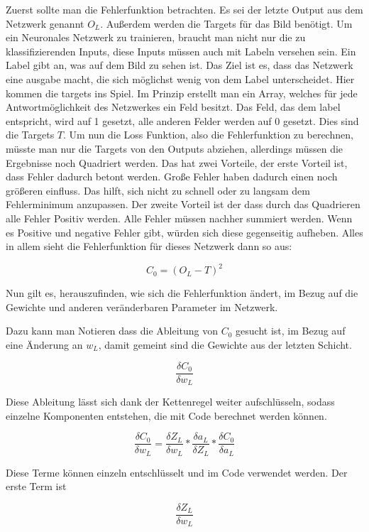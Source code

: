 \documentclass[12pt]{article}
\begin{document}
Zuerst sollte man die Fehlerfunktion betrachten. 
Es sei der letzte Output aus dem Netzwerk genannt $O_L$. Außerdem werden die Targets für das Bild benötigt. Um ein Neuronales Netzwerk zu trainieren, braucht man nicht nur die zu klassifizierenden Inputs, diese Inputs müssen auch mit Labeln versehen sein. Ein Label gibt an, was auf dem Bild zu sehen ist. Das Ziel ist es, dass das Netzwerk eine ausgabe macht, die sich möglichst wenig von dem Label unterscheidet. Hier kommen die targets ins Spiel. Im Prinzip erstellt man ein Array, welches für jede Antwortmöglichkeit des Netzwerkes ein Feld besitzt. Das Feld, das dem label entspricht, wird auf 1 gesetzt, alle anderen Felder werden auf 0 gesetzt. Dies sind die Targets $T$.
Um nun die Loss Funktion, also die Fehlerfunktion zu berechnen, müsste man nur die Targets von den Outputs abziehen, allerdings müssen die Ergebnisse noch Quadriert werden. Das hat zwei Vorteile, der erste Vorteil ist, dass Fehler dadurch betont werden. Große Fehler haben dadurch einen noch größeren einfluss. Das hilft, sich nicht zu schnell oder zu langsam dem Fehlerminimum anzupassen. Der zweite Vorteil ist der dass durch das Quadrieren alle Fehler Positiv werden. Alle Fehler müssen nachher summiert werden. Wenn es Positive und negative Fehler gibt, würden sich diese gegenseitig aufheben. 
Alles in allem sieht die Fehlerfunktion für dieses Netzwerk dann so aus:

$$C_0 = (O_L - T)^2$$

Nun gilt es, herauszufinden, wie sich die Fehlerfunktion ändert, im Bezug auf die Gewichte und anderen veränderbaren Parameter im Netzwerk.

Dazu kann man Notieren dass die Ableitung von $C_0$ gesucht ist, im Bezug auf eine Änderung an $w_L$, damit gemeint sind die Gewichte aus der letzten Schicht.

$$\frac{\delta C_0}{\delta w_L}$$

Diese Ableitung lässt sich dank der Kettenregel weiter aufschlüsseln, sodass einzelne Komponenten entstehen, die mit Code berechnet werden können.

$$\frac{\delta C_0}{\delta w_L}=
\frac{\delta Z_L}{\delta w_L}*
\frac{\delta a_L}{\delta Z_L}*
\frac{\delta C_0}{\delta a_L}$$

Diese Terme können einzeln entschlüsselt und im Code verwendet werden. Der erste Term ist

$$\frac{\delta Z_L}{\delta w_L}$$
\end{document}
